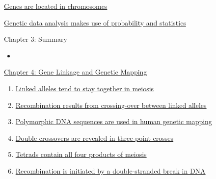 \documentclass[12pt,letterpaper]{article}
\newcommand{\thetitle}{\hypertarget{home}{Essential Genetics and Genomics}}
\begin{document}
\hypertarget{3.6}{}
\begin{secbox}{\hyperlink{3}{Genes are located in chromosomes}}{

}\end{secbox}

\hypertarget{3.7}{}
\begin{secbox}{\hyperlink{3}{Genetic data analysis makes use of probability and statistics}}{

}\end{secbox}

\begin{probbox}{Chapter 3: Summary}{
    \begin{itemize}
        \item
    \end{itemize}
}\end{probbox}



\clearpage

\renewcommand{\thetitle}{\hypertarget{4}{Gene Linkage and Genetic Mapping}}
\hypertarget{4}{} 

\begin{chapbox}{\hyperlink{home}{Chapter 4: Gene Linkage and Genetic Mapping}}
    \begin{enumerate}
        \item \hyperlink{4.1}{Linked alleles tend to stay together in meiosis}
        \item \hyperlink{4.2}{Recombination results from crossing-over between linked alleles}
        \item \hyperlink{4.3}{Polymorphic DNA sequences are used in human genetic mapping}
        \item \hyperlink{4.4}{Double crossovers are revealed in three-point crosses}
        \item \hyperlink{4.5}{Tetrads contain all four products of meiosis}
        \item \hyperlink{4.6}{Recombination is initiated by a double-stranded break in DNA}
    \end{enumerate}
\end{chapbox}
\end{document}
